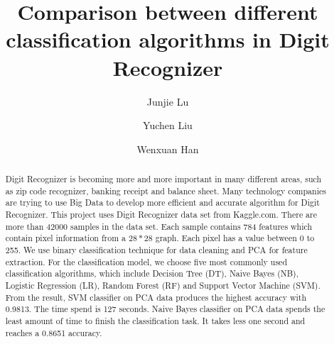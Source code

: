 \documentclass[sigconf]{acmart}
\begin{document}
\title{Comparison between different classification algorithms in Digit Recognizer}


\author{Junjie Lu}


\author{Yuchen Liu}

\author{Wenxuan Han}


\makeatletter
\def\subsubsection{\@startsection{subsubsection}{3}%
  \z@{.5\linespacing\@plus.7\linespacing}{.1\linespacing}%
  {\normalfont\itshape}}
\makeatother

\begin{abstract}

Digit Recognizer is becoming more and more important in many different areas, such as zip code recognizer, banking receipt and balance sheet. Many technology companies are trying to use Big Data to develop more efficient and accurate algorithm for Digit Recognizer. This project uses Digit Recognizer data set from Kaggle.com. There are more than 42000 samples in the data set. Each sample contains 784 features which contain pixel information from a $28*28$ graph. Each pixel has a value between 0 to 255. We use binary classification technique for data cleaning and PCA for feature extraction. For the classification model, we choose five most commonly used classification algorithms, which include Decision Tree (DT), Naive Bayes (NB), Logistic Regression (LR), Random Forest (RF) and Support Vector Machine (SVM). From the result, SVM classifier on PCA data produces the highest accuracy with 0.9813. The time spend is 127 seconds. Naive Bayes classifier on PCA data spends the least amount of time to finish the classification task. It takes less one second and reaches a 0.8651 accuracy.

\end{abstract}
\end{document}
